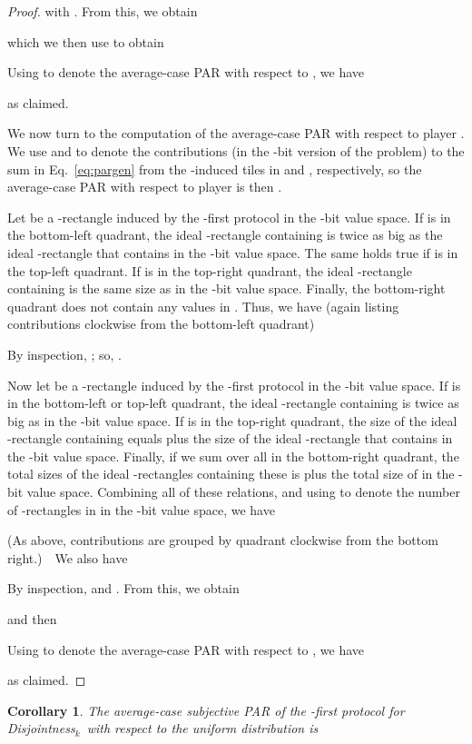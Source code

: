 \documentclass{article}
\theoremstyle{theorem}
\newtheorem{cor}[theorem]{Corollary}
\theoremstyle{definition}
\theoremstyle{remark}
\newcommand{\disjoint}{{\sc Dis\-joint\-ness}\ensuremath{_k}}
\begin{document}
\begin{proof}
with .  From this, we obtain

which we then use to obtain

Using  to denote the average-case PAR with respect to , we have

as claimed.

We now turn to the computation of the average-case PAR with respect to player .  We use  and  to denote the contributions (in the -bit version of the problem) to the sum in Eq.~\ref{eq:pargen} from the -induced tiles in  and , respectively, so the average-case PAR with respect to player  is then .

Let  be a -rectangle induced by the -first protocol in the -bit value space.  If  is in the bottom-left quadrant, the ideal -rectangle containing  is twice as big as the ideal -rectangle that contains  in the -bit value space.  The same holds true if  is in the top-left quadrant.  If  is in the top-right quadrant, the ideal -rectangle containing  is the same size as in the -bit value space.  Finally, the bottom-right quadrant does not contain any values in .  Thus, we have (again listing contributions clockwise from the bottom-left quadrant)

By inspection, ; so, .

Now let  be a -rectangle induced by the -first protocol in the -bit value space.  If  is in the bottom-left or top-left quadrant, the ideal -rectangle containing  is twice as big as in the -bit value space.  If  is in the top-right quadrant, the size of the ideal -rectangle containing  equals  plus the size of the ideal -rectangle that contains  in the -bit value space.  Finally, if we sum over all  in the bottom-right quadrant, the total sizes of the ideal -rectangles containing these  is  plus the total size of  in the -bit value space.  Combining all of these relations, and using  to denote the number of -rectangles in  in the -bit value space, we have

(As above, contributions are grouped by quadrant clockwise from the bottom right.)\ \ We also have

By inspection,  and .  From this, we obtain

and then

Using  to denote the average-case PAR with respect to , we have

as claimed.
\end{proof}

\begin{cor}
The average-case subjective PAR of the -first protocol for \disjoint\ with respect to the uniform distribution is

\end{cor}
\end{document}
